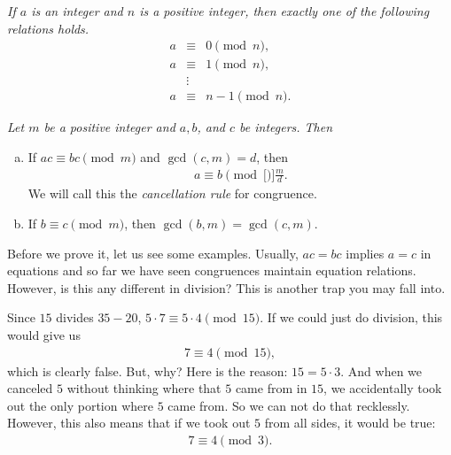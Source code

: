 \documentclass{subfile}
\begin{document}
	
	\begin{proposition}\slshape
		If $a$ is an integer and $n$ is a positive integer, then exactly one of the following relations holds.
			\begin{eqnarray*}
				a &\equiv& 0 \pmod n,\\
				a &\equiv& 1 \pmod n,\\
				  &\vdots&\\
				a &\equiv& n-1 \pmod{n}.
			\end{eqnarray*}
	\end{proposition}
	
	
	\begin{theorem}\slshape
		Let $m$ be a positive integer and $a, b$, and $c$ be integers. Then
		\begin{enumerate}[(a)]
			\item If $ac \equiv bc \pmod m$ and $\gcd(c,m)=d$, then 
				\begin{align*}
					 a \equiv b \pmod[\Big]{\frac{m}{d}}. 
				 \end{align*}
			We will call this the \textit{cancellation rule} for congruence.
			\item If $b \equiv c \pmod m$, then $\gcd(b,m)=\gcd(c,m)$.
		\end{enumerate}
	\end{theorem}
Before we prove it, let us see some examples. Usually, $ac=bc$ implies $a=c$ in equations and so far we have seen congruences maintain equation relations. However, is this any different in division? This is another trap you may fall into.

Since $15$ divides $35-20$, $5\cdot7\equiv5\cdot4\pmod{15}$. If we could just do division, this would give us
	\begin{align*}
		7\equiv4\pmod{15},
	\end{align*}
which is clearly false. But, why? Here is the reason: $15=5\cdot3$. And when we canceled $5$ without thinking where that $5$ came from in $15$, we accidentally took out the only portion where $5$ came from. So we can not do that recklessly. However, this also means that if we took out $5$ from all sides, it would be true:
	\begin{align*}
		7\equiv4\pmod{3}.
	\end{align*}
\end{document}
